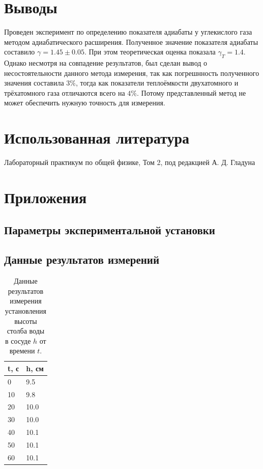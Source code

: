 \documentclass[12pt]{article}
\begin{document}
\section{Выводы}
Проведен эксперимент по определению показателя адиабаты у углекислого газа методом адиабатического 
расширения. Полученное значение показателя адиабаты составило $\gamma = 1.45 \pm 0.05$. При этом 
теоретическая оценка показала $\gamma_T = 1.4$. Однако несмотря на совпадение результатов, был сделан вывод о 
несостоятельности данного метода измерения, так как погрешнность полученного значения составила $3\%$, 
тогда как показатели теплоёмкости двухатомного и трёхатомного газа отличаются всего на $4\%$. Потому 
представленный метод не может обеспечить нужную точность для измерения.    

\section{Использованная литература}
\begin{thebibliography}{9}
    Лабораторный практикум по общей физике, Том 2, под редакцией А. Д. Гладуна
\end{thebibliography}

\section{Приложения}
\subsection{Параметры экспериментальной установки} \label{app_1}

\subsection{Данные результатов измерений} \label{app_2}
\begin{table}[H]
    \centering
    \begin{tabular}{|l|l|}
        \hline
        t, с & h, см \\ 
        \hline
        0    & 9.5   \\ 
        10   & 9.8   \\
        20   & 10.0  \\ 
        30   & 10.0  \\ 
        40   & 10.1  \\
        50   & 10.1  \\
        60   & 10.1  \\
        \hline
    \end{tabular}
    \caption{Данные результатов измерения установления высоты столба воды в сосуде $h$ от времени $t$.}
    \label{tab:1}
\end{table}
\end{document}
